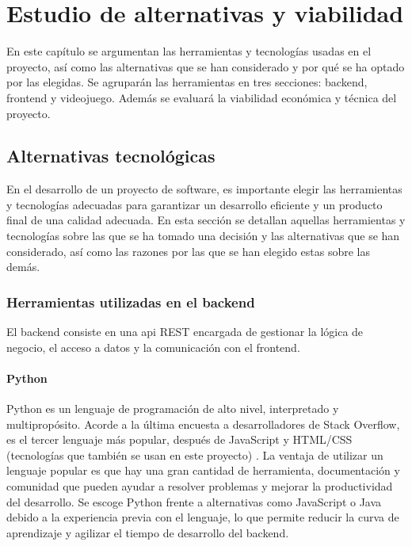 \chapter{Estudio de alternativas y viabilidad}
\label{cap:alternativas}
En este capítulo se argumentan las herramientas y tecnologías usadas en el proyecto, así como las
alternativas que se han considerado y por qué se ha optado por las elegidas. Se agruparán las
herramientas en tres secciones: \gls{backend}, \gls{frontend} y videojuego. Además se evaluará la
viabilidad económica y técnica del proyecto.

\section{Alternativas tecnológicas}
\label{c08:sec:alternativas-tecnologicas}
En el desarrollo de un proyecto de software, es importante elegir las
herramientas y tecnologías adecuadas para garantizar un desarrollo eficiente y
un producto final de una calidad adecuada. En esta sección se detallan aquellas
herramientas y tecnologías sobre las que se ha tomado una decisión y las
alternativas que se han considerado, así como las razones por las que se han
elegido estas sobre las demás.

\subsection{Herramientas utilizadas en el backend}
\label{c08:subsec:herramientas-backend}
El \gls{backend} consiste en una \gls{api} REST encargada de gestionar la lógica de negocio, el acceso a
datos y la comunicación con el \gls{frontend}.

\subsubsection{Python}
\label{c08:subsubsec:python}
Python es un lenguaje de programación de alto nivel, interpretado y multipropósito. Acorde a
la última encuesta a desarrolladores de Stack Overflow, es el tercer lenguaje más popular, después
de JavaScript y HTML/CSS (tecnologías que también se usan en este proyecto)
\parencite{encuestaTecnologias2024}. La ventaja de utilizar un lenguaje popular es que hay una gran
cantidad de herramienta, documentación y comunidad que pueden ayudar a resolver problemas y
mejorar la productividad del desarrollo. Se escoge Python frente a alternativas como JavaScript o
Java debido a la experiencia previa con el lenguaje, lo que permite reducir la curva de
aprendizaje y agilizar el tiempo de desarrollo del \gls{backend}.


